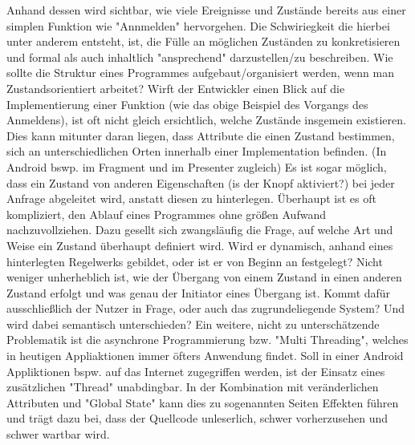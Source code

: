 Anhand dessen wird sichtbar, wie viele Ereignisse und Zustände bereits aus einer simplen Funktion wie "Annmelden" hervorgehen.
Die Schwiriegkeit die hierbei unter anderem entsteht, ist, die Fülle an möglichen Zuständen zu konkretisieren und 
formal als auch inhaltlich "ansprechend" darzustellen/zu beschreiben.
Wie sollte die Struktur eines Programmes aufgebaut/organisiert werden, wenn man Zustandsorientiert arbeitet?
Wirft der Entwickler einen Blick auf die Implementierung  einer Funktion (wie das obige Beispiel des Vorgangs des Anmeldens), 
ist oft nicht gleich ersichtlich, welche Zustände insgemein existieren.
Dies kann mitunter daran liegen, dass Attribute die einen Zustand bestimmen, sich an unterschiedlichen Orten innerhalb
einer Implementation befinden. (In Android bswp. im Fragment und im Presenter zugleich)
Es ist sogar möglich, dass ein Zustand von anderen Eigenschaften (is der Knopf aktiviert?) bei jeder Anfrage abgeleitet wird,
anstatt diesen zu hinterlegen.
Überhaupt ist es oft kompliziert, den Ablauf eines Programmes ohne größen Aufwand nachzuvollziehen.
Dazu gesellt sich zwangsläufig die Frage, auf welche Art und Weise ein Zustand überhaupt definiert wird. 
Wird er dynamisch, anhand eines hinterlegten Regelwerks gebildet, oder ist er von Beginn an festgelegt?
Nicht weniger unherheblich ist, wie der Übergang von einem Zustand in einen anderen Zustand erfolgt und was 
genau der Initiator eines Übergang ist.
Kommt dafür ausschließlich der Nutzer in Frage, oder auch das zugrundeliegende System? Und wird dabei semantisch  unterschieden? 
Ein weitere, nicht zu unterschätzende Problematik ist die asynchrone Programmierung bzw. "Multi Threading",
welches in heutigen Appliaktionen immer öfters Anwendung findet. Soll in einer Android Appliktionen bspw. auf das Internet
zugegriffen werden, ist der Einsatz eines zusätzlichen "Thread" un­ab­ding­bar.
In der Kombination mit veränderlichen Attributen und "Global State" kann dies zu sogenannten Seiten Effekten führen und trägt dazu bei, 
dass der Quellcode unleserlich, schwer vorherzusehen und schwer wartbar wird.




% 



